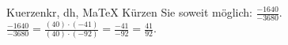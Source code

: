 \begin{MAufgabe}{Kuerzen}{kr, dh, MaTeX}
K\"urzen Sie soweit m\"oglich: $\frac{-1640}{-3680}$.\\ 
\ifLsg\MLoesung
\quad $\frac{-1640}{-3680}=\frac{(40)\cdot(-41)}{(40)\cdot(-92)}=\frac{-41}{-92}=\frac{41}{92}$.\else\relax\fi
 \end{MAufgabe}